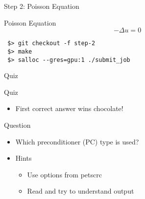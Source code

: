 



\begin{frame}[fragile]{Step 2: Poisson Equation}

  \begin{block}{Poisson Equation}
    \begin{equation*}
     - \Delta u = 0
    \end{equation*}

 \begin{lstlisting}
 $> git checkout -f step-2
 $> make
 $> salloc --gres=gpu:1 ./submit_job
 \end{lstlisting}

  \end{block}


\end{frame}



\begin{frame}[fragile]{Quiz}

  \begin{block}{Quiz}
    \begin{itemize}
     \item First correct answer wins chocolate!
    \end{itemize}
  \end{block}

  \begin{block}{Question}
    \begin{itemize}
     \item Which preconditioner (PC) type is used?
     \item Hints
       \begin{itemize}
        \item Use options from petscrc 
        \item Read and try to understand output
       \end{itemize}
    \end{itemize}
  \end{block}
\end{frame}


